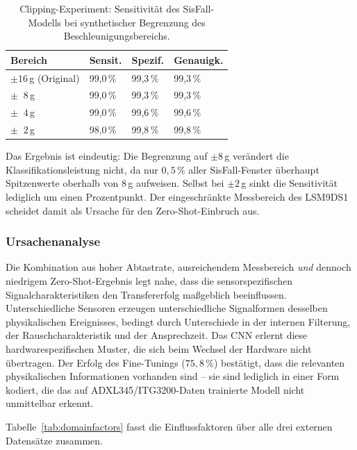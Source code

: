 \documentclass[11pt,a4paper,oneside]{report}
\begin{document}
\begin{table}[H]
\centering
\caption{Clipping-Experiment: Sensitivität des SisFall-Modells bei
         synthetischer Begrenzung des Beschleunigungsbereichs.}
\label{tab:clipping}
\small
\begin{tabularx}{0.75\textwidth}{l C{1.7cm} C{1.7cm} C{1.7cm}}
\toprule
\textbf{Bereich} & \textbf{Sensit.} & \textbf{Spezif.} & \textbf{Genauigk.} \\
\midrule
$\pm 16$\,g (Original) & 99,0\,\% & 99,3\,\% & 99,3\,\% \\
$\pm\;\;8$\,g          & 99,0\,\% & 99,3\,\% & 99,3\,\% \\
$\pm\;\;4$\,g          & 99,0\,\% & 99,6\,\% & 99,6\,\% \\
$\pm\;\;2$\,g          & 98,0\,\% & 99,8\,\% & 99,8\,\% \\
\bottomrule
\end{tabularx}
\end{table}

Das Ergebnis ist eindeutig: Die Begrenzung auf $\pm 8$\,g verändert
die Klassifikationsleistung nicht, da nur $0{,}5\,\%$ aller
SisFall-Fenster überhaupt Spitzenwerte oberhalb von $8$\,g aufweisen.
Selbst bei $\pm 2$\,g sinkt die Sensitivität lediglich um
einen Prozentpunkt. Der eingeschränkte Messbereich des LSM9DS1
scheidet damit als Ursache für den Zero-Shot-Einbruch aus.

\subsubsection{Ursachenanalyse}

Die Kombination aus hoher Abtastrate, ausreichendem Messbereich
\emph{und} dennoch niedrigem Zero-Shot-Ergebnis legt nahe, dass
die sensorspezifischen Signalcharakteristiken den Transfererfolg
maßgeblich beeinflussen. Unterschiedliche Sensoren erzeugen
unterschiedliche Signalformen desselben physikalischen Ereignisses,
bedingt durch Unterschiede in der internen Filterung, der
Rauschcharakteristik und der Ansprechzeit. Das CNN erlernt diese
hardwarespezifischen Muster, die sich beim Wechsel der Hardware
nicht übertragen. Der Erfolg des Fine-Tunings ($75{,}8\,\%$)
bestätigt, dass die relevanten physikalischen Informationen
vorhanden sind -- sie sind lediglich in einer Form kodiert, die
das auf ADXL345/ITG3200-Daten trainierte Modell nicht unmittelbar
erkennt.

Tabelle~\ref{tab:domainfactors} fasst die Einflussfaktoren über
alle drei externen Datensätze zusammen.
\end{document}
